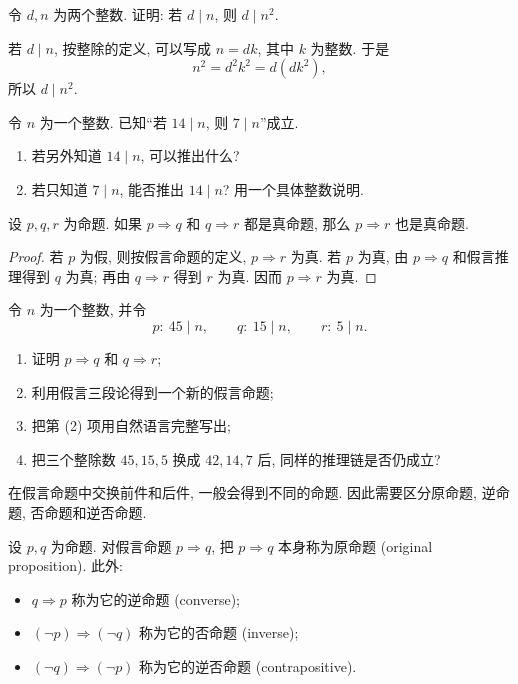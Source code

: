 \documentclass[usesamecnt, thmcnt=section, lang=cn, newtx, 10pt, scheme=chinese]{elegantbook}
\begin{document}
\begin{example}\label{ex:div-square}
令 $d,n$ 为两个整数. 证明: 若 $d\mid n$, 则 $d\mid n^2$.
\end{example}

\begin{solution}
若 $d\mid n$, 按整除的定义, 可以写成 $n=dk$, 其中 $k$ 为整数. 于是
\[
 n^2=d^2k^2=d(dk^2),
\]
所以 $d\mid n^2$.
\end{solution}

\begin{exercise}
\label{ex:logic-09}
令 $n$ 为一个整数. 已知``若 $14\mid n$, 则 $7\mid n$''成立.
\begin{enumerate}[label=\rm(\arabic*)]
  \item 若另外知道 $14\mid n$, 可以推出什么?
  \item 若只知道 $7\mid n$, 能否推出 $14\mid n$? 用一个具体整数说明.
\end{enumerate}
\end{exercise}

\begin{theorem}[假言三段论]\label{thm:hypothetical-syllogism}
设 $p,q,r$ 为命题. 如果 $p\Rightarrow q$ 和 $q\Rightarrow r$ 都是真命题, 那么 $p\Rightarrow r$ 也是真命题.
\end{theorem}

\begin{proof}
若 $p$ 为假, 则按假言命题的定义, $p\Rightarrow r$ 为真. 若 $p$ 为真, 由 $p\Rightarrow q$ 和假言推理得到 $q$ 为真; 再由 $q\Rightarrow r$ 得到 $r$ 为真. 因而 $p\Rightarrow r$ 为真.
\end{proof}

\begin{exercise}
\label{ex:logic-10}
令 $n$ 为一个整数, 并令
\[
 p:\ 45\mid n,\qquad q:\ 15\mid n,\qquad r:\ 5\mid n.
\]
\begin{enumerate}[label=\rm(\arabic*)]
  \item 证明 $p\Rightarrow q$ 和 $q\Rightarrow r$;
  \item 利用假言三段论得到一个新的假言命题;
  \item 把第 (2) 项用自然语言完整写出;
  \item 把三个整除数 $45,15,5$ 换成 $42,14,7$ 后, 同样的推理链是否仍成立?
\end{enumerate}
\end{exercise}

在假言命题中交换前件和后件, 一般会得到不同的命题. 因此需要区分原命题, 逆命题, 否命题和逆否命题.

\begin{definition}\label{def:converse-contrapositive}
设 $p,q$ 为命题. 对假言命题 $p\Rightarrow q$, 把 $p\Rightarrow q$ 本身称为{\color{blue}原命题 (original proposition)}. 此外:
\begin{itemize}
  \item $q\Rightarrow p$ 称为它的{\color{blue}逆命题 (converse)};
  \item $(\neg p)\Rightarrow(\neg q)$ 称为它的{\color{blue}否命题 (inverse)};
  \item $(\neg q)\Rightarrow(\neg p)$ 称为它的{\color{blue}逆否命题 (contrapositive)}.
\end{itemize}
\end{definition}
\end{document}
